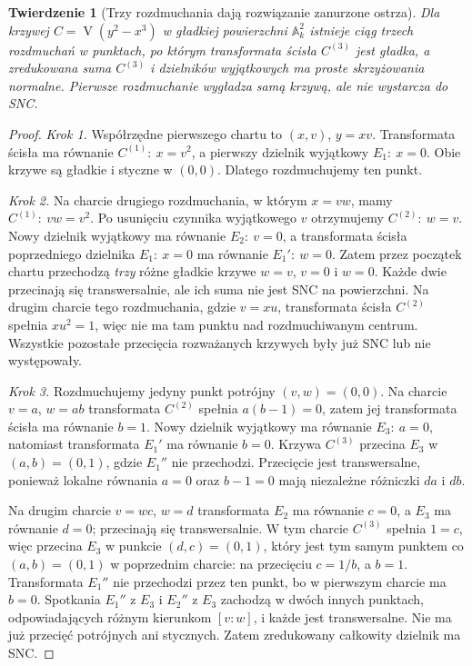 \documentclass[11pt,a4paper,openany]{report}
\numberwithin{equation}{section}
\theoremstyle{plain}
\newtheorem{twierdzenie}{Twierdzenie}[section]
\theoremstyle{definition}
\theoremstyle{remark}
\newcommand{\A}{\mathbb A}
\newcommand{\V}{\operatorname V}
\begin{document}
\begin{twierdzenie}[Trzy rozdmuchania dają rozwiązanie zanurzone ostrza]
\label{tw:ga5-embedded-cusp}
Dla krzywej $C=\V(y^2-x^3)$ w gładkiej powierzchni
$\A^2_k$ istnieje ciąg trzech rozdmuchań w punktach,
po którym transformata ścisła $C^{(3)}$ jest gładka,
a zredukowana suma $C^{(3)}$ i dzielników wyjątkowych
ma proste skrzyżowania normalne. Pierwsze rozdmuchanie
wygładza samą krzywą, ale nie wystarcza do SNC.
\end{twierdzenie}
\begin{proof}
\emph{Krok 1.} Współrzędne pierwszego chartu to
$(x,v)$, $y=xv$. Transformata ścisła ma równanie
$C^{(1)}:\ x=v^2$, a pierwszy dzielnik wyjątkowy
$E_1:\ x=0$. Obie krzywe są gładkie i styczne
w $(0,0)$. Dlatego rozdmuchujemy ten punkt.

\emph{Krok 2.} Na charcie drugiego rozdmuchania,
w którym $x=vw$, mamy
$C^{(1)}:\ vw=v^2$. Po usunięciu czynnika
wyjątkowego $v$ otrzymujemy
$C^{(2)}:\ w=v$. Nowy dzielnik wyjątkowy ma
równanie $E_2:\ v=0$, a transformata ścisła
poprzedniego dzielnika $E_1:\ x=0$ ma równanie
$E_1':\ w=0$. Zatem przez początek chartu
przechodzą \emph{trzy} różne gładkie krzywe
$w=v$, $v=0$ i $w=0$. Każde dwie przecinają się
transwersalnie, ale ich suma nie jest SNC na powierzchni.
Na drugim charcie tego rozdmuchania, gdzie $v=xu$,
transformata ścisła $C^{(2)}$ spełnia $xu^2=1$,
więc nie ma tam punktu nad rozdmuchiwanym centrum.
Wszystkie pozostałe przecięcia rozważanych krzywych
były już SNC lub nie występowały.

\emph{Krok 3.} Rozdmuchujemy jedyny punkt potrójny
$(v,w)=(0,0)$. Na charcie $v=a$, $w=ab$
transformata $C^{(2)}$ spełnia
$a(b-1)=0$, zatem jej transformata ścisła ma
równanie $b=1$. Nowy dzielnik wyjątkowy ma
równanie $E_3:\ a=0$, natomiast transformata $E_1'$
ma równanie $b=0$. Krzywa $C^{(3)}$ przecina
$E_3$ w $(a,b)=(0,1)$, gdzie $E_1''$ nie przechodzi.
Przecięcie jest transwersalne, ponieważ lokalne
równania $a=0$ oraz $b-1=0$ mają niezależne
różniczki $da$ i $db$.

Na drugim charcie $v=wc$, $w=d$ transformata
$E_2$ ma równanie $c=0$, a $E_3$ ma równanie
$d=0$; przecinają się transwersalnie. W tym charcie
$C^{(3)}$ spełnia $1=c$, więc przecina $E_3$
w punkcie $(d,c)=(0,1)$, który jest tym samym
punktem co $(a,b)=(0,1)$ w poprzednim charcie:
na przecięciu $c=1/b$, a $b=1$.
Transformata $E_1''$ nie przechodzi przez ten punkt,
bo w pierwszym charcie ma $b=0$. Spotkania
$E_1''$ z $E_3$ i $E_2''$ z $E_3$ zachodzą
w dwóch innych punktach, odpowiadających różnym
kierunkom $[v:w]$, i każde jest transwersalne.
Nie ma już przecięć potrójnych ani stycznych.
Zatem zredukowany całkowity dzielnik ma SNC.
\end{proof}
\end{document}
